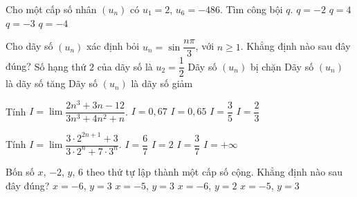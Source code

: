 \begin{ex}%
	Cho một cấp số nhân $\left(u_n\right)$ có $u_1=2$, $u_6=-486$. Tìm công bội $q$.
	\choice
	{ $q=-2$}
	{ $q=4$}
	{\True $q=-3$}
	{  $q=-4$}
\end{ex}

\begin{ex}%
	Cho dãy số
	$\left(u_n\right)$  xác định bỏi $u_n=\sin \dfrac{n\pi }{3}$, với $n \ge 1$. Khẳng định nào sau đây đúng?
	\choice
	{ Số hạng thứ $2$ của dãy số là $u_2=\dfrac{1}{2}$}
	{ \True Dãy số $\left(u_n\right)$ bị chặn } 
	{ Dãy số $\left(u_n\right)$ là dãy số tăng}
	{ Dãy số $\left(u_n\right)$  là dãy số giảm}
\end{ex}

\begin{ex}%
	 Tính $I = \lim \dfrac {2n^3 + 3n - 12} {3n^3 + 4n^2 + n}$.
	\choice
	{$I = 0{,}67$}
	{$I = 0{,}65$}
	{$I = \dfrac{3}{5}$}
	{\True $I = \dfrac{2}{3}$}
\end{ex}

\begin{ex}%
	Tính $I = \lim \dfrac {3\cdot 2^{2n + 1} + 3} {3\cdot 2^n + 7\cdot 3^n}.$ 
	\choice
	{$I = \dfrac{6}{7}$}
	{$I = 2$}
	{$I = \dfrac{3}{7}$}
	{\True $I =  + \infty $}
\end{ex}

\begin{ex}%
	Bốn số $x$, $-2$, $y$, $6$ theo thứ tự lập thành một cấp số cộng. Khẳng định nào sau đây đúng?	
	\choice
	{$x =  - 6$, $y = 3$}
	{$x =  - 5$, $y = 3$}
	{\True $x =  - 6$, $y = 2$}
	{$x =  - 5$, $y = 3$}
\end{ex}

